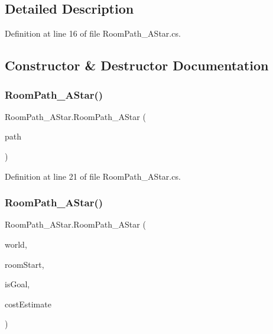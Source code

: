 \subsection{Detailed Description}


Definition at line 16 of file Room\+Path\+\_\+\+A\+Star.\+cs.



\subsection{Constructor \& Destructor Documentation}
\mbox{\label{class_room_path___a_star_a8f2c182f3cf40649f44a70047d825b63}} 
\subsubsection{\texorpdfstring{Room\+Path\+\_\+\+A\+Star()}{RoomPath\_AStar()}\hspace{0.1cm}{\footnotesize\ttfamily [1/2]}}
{\footnotesize\ttfamily Room\+Path\+\_\+\+A\+Star.\+Room\+Path\+\_\+\+A\+Star (\begin{DoxyParamCaption}\item[{Queue$<$ \hyperlink{class_project_porcupine_1_1_rooms_1_1_room}{Room} $>$}]{path }\end{DoxyParamCaption})}



Definition at line 21 of file Room\+Path\+\_\+\+A\+Star.\+cs.

\mbox{\label{class_room_path___a_star_ad34e154127f30fc296a7e5a130e7a838}} 
\subsubsection{\texorpdfstring{Room\+Path\+\_\+\+A\+Star()}{RoomPath\_AStar()}\hspace{0.1cm}{\footnotesize\ttfamily [2/2]}}
{\footnotesize\ttfamily Room\+Path\+\_\+\+A\+Star.\+Room\+Path\+\_\+\+A\+Star (\begin{DoxyParamCaption}\item[{\hyperlink{class_world}{World}}]{world,  }\item[{\hyperlink{class_project_porcupine_1_1_rooms_1_1_room}{Room}}]{room\+Start,  }\item[{Pathfinder.\+Room\+Goal\+Evaluator}]{is\+Goal,  }\item[{Pathfinder.\+Room\+Pathfinding\+Heuristic}]{cost\+Estimate }\end{DoxyParamCaption})}



